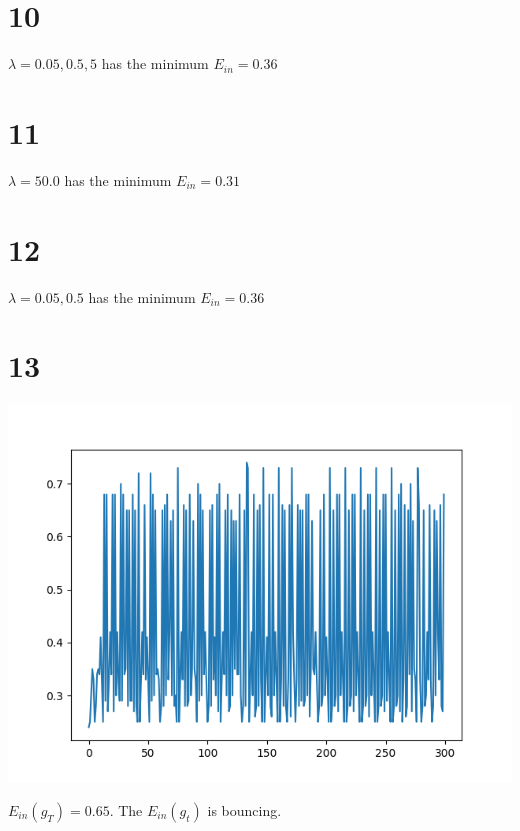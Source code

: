 \documentclass[12pt]{article}
\begin{document}
\section*{10}
$\lambda = 0.05, 0.5, 5$ has the minimum $E_{in} = 0.36$

\section*{11}
$\lambda = 50.0$ has the minimum $E_{in} = 0.31$

\section*{12}
$\lambda = 0.05, 0.5$ has the minimum $E_{in} = 0.36$

\section*{13}
\begin{center}
    \includegraphics[scale=0.5]{p13.png}
\end{center}
$E_{in}(g_T) = 0.65$. The $E_{in}(g_t)$ is bouncing.
\end{document}
